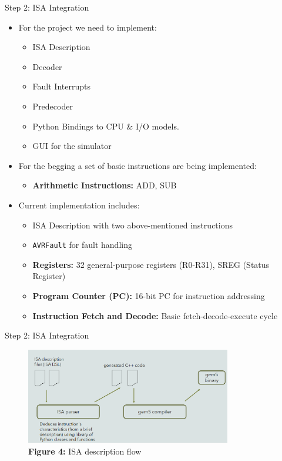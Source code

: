 \begin{frame}{Step 2: ISA Integration}
  \begin{itemize}
    \item For the project we need to implement:
    \begin{itemize}
      \item ISA Description
      \item Decoder
      \item Fault Interrupts
      \item Predecoder
      \item Python Bindings to CPU \& I/O models.
      \item GUI for the simulator
    \end{itemize}
    \item For the begging a set of basic instructions are being implemented:
    \begin{itemize}
      \item \textbf{Arithmetic Instructions:} ADD, SUB
    \end{itemize}
    \item Current implementation includes:
    \begin{itemize}
      \item ISA Description with two above-mentioned instructions
      \item \texttt{AVRFault} for fault handling
      \item \textbf{Registers:} 32 general-purpose registers (R0-R31), SREG (Status Register)
      \item \textbf{Program Counter (PC):} 16-bit PC for instruction addressing
      \item \textbf{Instruction Fetch and Decode:} Basic fetch-decode-execute cycle
    \end{itemize}
  \end{itemize}
\end{frame}

\begin{frame}[fragile]{Step 2: ISA Integration}
  \begin{figure}
    \centering
      \includegraphics[width=0.8\textwidth]{images/flow.png}\\
      \textbf{Figure 4:} ISA description flow
  \end{figure}
\end{frame}

